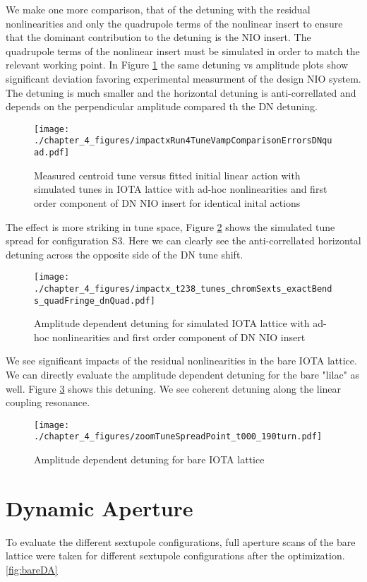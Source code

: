 We make one more comparison, that of the detuning with the residual nonlinearities and only the quadrupole terms of the nonlinear insert to ensure that the dominant contribution to the detuning is the NIO insert. The quadrupole terms of the nonlinear insert must be simulated in order to match the relevant working point. In Figure \ref{fig:t238ampDetuneQuad} the same detuning vs amplitude plots show significant deviation favoring experimental measurment of the design NIO system. The detuning is much smaller and the horizontal detuning is anti-correllated and depends on the perpendicular amplitude compared th the DN detuning.

\begin{figure}
	\centering
	\texttt{[image: ./chapter\_4\_figures/impactxRun4TuneVampComparisonErrorsDNquad.pdf]}
	\caption{Measured centroid tune versus fitted initial linear action with simulated tunes in IOTA lattice with ad-hoc nonlinearities and first order component of DN NIO insert for identical inital actions}
	\label{fig:t238ampDetuneQuad}
\end{figure}

The effect is more striking in tune space, Figure \ref{fig:t238detuneQuad} shows the simulated tune spread for configuration S3. Here we can clearly see the anti-correllated horizontal detuning across the opposite side of the DN tune shift.

\begin{figure}
	\centering
	\texttt{[image: ./chapter\_4\_figures/impactx\_t238\_tunes\_chromSexts\_exactBends\_quadFringe\_dnQuad.pdf]}
	\caption{Amplitude dependent detuning for simulated IOTA lattice with ad-hoc nonlinearities and first order component of DN NIO insert}
	\label{fig:t238detuneQuad}
\end{figure}

We see significant impacts of the residual nonlinearities in the bare IOTA lattice. We can directly evaluate the amplitude dependent detuning for the bare "lilac" as well. Figure \ref{fig:t0detune} shows this detuning. We see coherent detuning along the linear coupling resonance.

\begin{figure}
	\centering
	\texttt{[image: ./chapter\_4\_figures/zoomTuneSpreadPoint\_t000\_190turn.pdf]}
	\caption{Amplitude dependent detuning for bare IOTA lattice}
	\label{fig:t0detune}
\end{figure}

\section{Dynamic Aperture} \label{sec:DA}
To evaluate the different sextupole configurations, full aperture scans of the bare lattice were taken for different sextupole configurations after the optimization. \ref{fig:bareDA}

